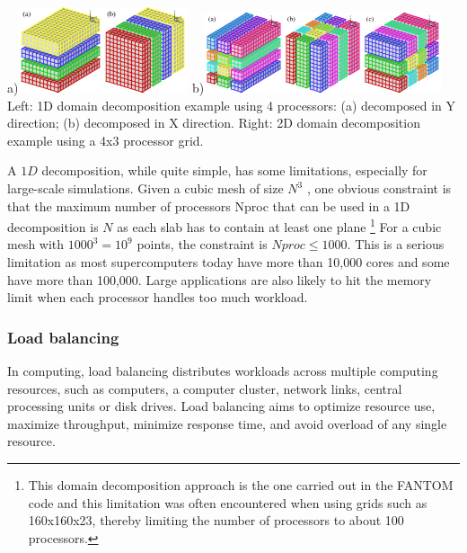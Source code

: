 \begin{center}
a)\includegraphics[width=5cm]{images/parallel/dd1}
\hspace{1cm}
b)\includegraphics[width=7cm]{images/parallel/dd2}\\
{\captionfont Left: 1D domain decomposition example using 4 processors: 
(a) decomposed in Y direction; (b) decomposed in X direction.
Right: 2D domain decomposition example using a 4x3 processor grid.}
\end{center}

A $1D$ decomposition, while quite simple, has some limitations, especially for large-scale simulations. 
Given a cubic mesh of size $N^3$ , one obvious constraint is that the maximum number of processors 
Nproc that can be used in a 1D decomposition is $N$ as each slab has to contain at least one plane
\footnote{This domain decomposition approach is the one carried out in the FANTOM code \cite{thie11}
and this limitation was often encountered when using grids such as 160x160x23, thereby limiting the number 
of processors to about 100 processors.}
For a cubic mesh with $1000^3=10^9$ points, the constraint is $Nproc \leq 1000$. 
This is a serious limitation as most supercomputers today have more than 
10,000 cores and some have more than 100,000. 
Large applications are also likely to hit the memory limit when each processor handles too much workload. 



\subsubsection{Load balancing}


In computing, load balancing distributes workloads across multiple computing resources, such as computers, a computer cluster, network links, central processing units or disk drives. Load balancing aims to optimize resource use, maximize throughput, minimize response time, and avoid overload of any single resource. 

